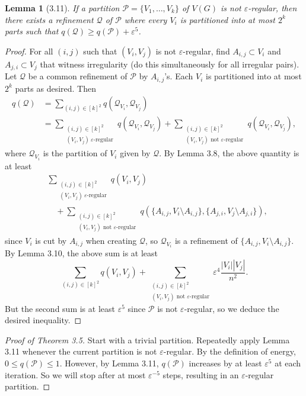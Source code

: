 \documentclass[UTF8,11pt]{ctexart}
\newtheorem*{lemma}{Lemma}
\theoremstyle{definition}
\begin{document}
\begin{lemma}[3.11]
If a partition $\mathcal P=\{V_1,\ldots,V_k\}$ of $V(G)$ is not $\varepsilon$-regular, then there exists a refinement $\mathcal Q$ of $\mathcal P$ where every $V_i$ is partitioned into at most $2^k$ parts such that $q(\mathcal Q)\geq q(\mathcal P)+\varepsilon^5$.
\end{lemma}
\begin{proof}
For all $(i,j)$ such that $(V_i,V_j)$ is not $\varepsilon$-regular, find $A_{i,j}\subset V_i$ and $A_{j,i}\subset V_j$ that witness irregularity (do this simultaneously for all irregular pairs). Let $\mathcal Q$ be a common refinement of $\mathcal P$ by $A_{i,j}$'s. Each $V_i$ is partitioned into at most $2^k$ parts as desired. Then
\[\begin{split}
q(\mathcal Q)&=\sum_{(i,j)\in[k]^2}q(\mathcal Q_{V_i},\mathcal Q_{V_j})\\
&=\sum_{\substack{(i,j)\in[k]^2\\(V_i,V_j)\ \varepsilon\text{-regular}}}q(\mathcal Q_{V_i},\mathcal Q_{V_j})
+\sum_{\substack{(i,j)\in[k]^2\\(V_i,V_j)\text{ not }\varepsilon\text{-regular}}}q(\mathcal Q_{V_i},\mathcal Q_{V_j}),
\end{split}\]
where $\mathcal Q_{V_i}$ is the partition of $V_i$ given by $\mathcal Q$. By Lemma 3.8, the above quantity is at least
\[\begin{split}
&\sum_{\substack{(i,j)\in[k]^2\\(V_i,V_j)\ \varepsilon\text{-regular}}}q(V_i,V_j)\\
&\quad+\sum_{\substack{(i,j)\in[k]^2\\(V_i,V_j)\text{ not }\varepsilon\text{-regular}}}
q(\{A_{i,j},V_i\setminus A_{i,j}\},\{A_{j,i},V_j\setminus A_{j,i}\}),
\end{split}\]
since $V_i$ is cut by $A_{i,j}$ when creating $\mathcal Q$, so $\mathcal Q_{V_i}$ is a refinement of $\{A_{i,j},V_i\setminus A_{i,j}\}$. By Lemma 3.10, the above sum is at least
\[\sum_{(i,j)\in[k]^2}q(V_i,V_j)+\sum_{\substack{(i,j)\in[k]^2\\(V_i,V_j)\text{ not }\varepsilon\text{-regular}}}\varepsilon^4\frac{|V_i||V_j|}{n^2}.\]
But the second sum is at least $\varepsilon^5$ since $\mathcal P$ is not $\varepsilon$-regular, so we deduce the desired inequality.
\end{proof}
\begin{proof}[Proof of Theorem 3.5]
Start with a trivial partition. Repeatedly apply Lemma 3.11 whenever the current partition is not $\varepsilon$-regular. By the definition of energy, $0\leq q(\mathcal P)\leq1$. However, by Lemma 3.11, $q(\mathcal P)$ increases by at least $\varepsilon^5$ at each iteration. So we will stop after at most $\varepsilon^{-5}$ steps, resulting in an $\varepsilon$-regular partition.
\end{proof}
\end{document}
